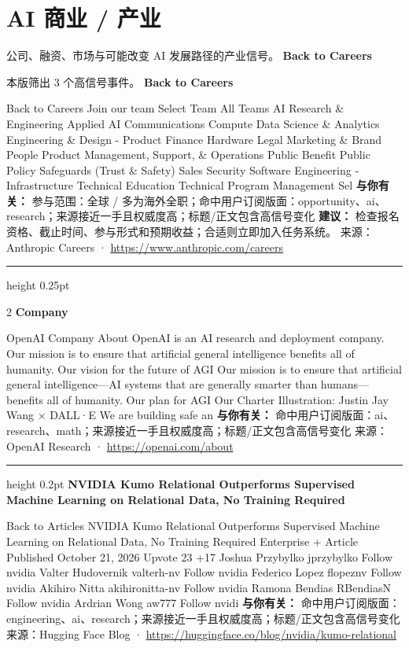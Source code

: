 \documentclass[10.5pt]{ctexart}
\begin{document}
\section*{AI 商业 / 产业}
{\color{ormuted} 公司、融资、市场与可能改变 AI 发展路径的产业信号。}
\vspace{2mm}
{\LARGE\bfseries Back to Careers}\par
\vspace{1mm}
{\color{ormuted} 本版筛出 3 个高信号事件。}
\vspace{3mm}
{\Large\bfseries Back to Careers}\par
Back to Careers Join our team Select Team All Teams AI Research \& Engineering Applied AI Communications Compute Data Science \& Analytics Engineering \& Design - Product Finance Hardware Legal Marketing \& Brand People Product Management, Support, \& Operations Public Benefit Public Policy Safeguards (Trust \& Safety) Sales Security Software Engineering - Infrastructure Technical Education Technical Program Management Sel
\textbf{与你有关：} 参与范围：全球 / 多为海外全职；命中用户订阅版面：opportunity、ai、research；来源接近一手且权威度高；标题/正文包含高信号变化
\textbf{建议：} 检查报名资格、截止时间、参与形式和预期收益；合适则立即加入任务系统。
{\footnotesize\color{ormuted} 来源：Anthropic Careers · \url{https://www.anthropic.com/careers}}
\vspace{4mm}
\hrule height 0.25pt
\vspace{3mm}
\begin{multicols}{2}
{\large\bfseries Company}\par
OpenAI Company About OpenAI is an AI research and deployment company. Our mission is to ensure that artificial general intelligence benefits all of humanity. Our vision for the future of AGI Our mission is to ensure that artificial general intelligence—AI systems that are generally smarter than humans—benefits all of humanity. Our plan for AGI Our Charter Illustration: Justin Jay Wang × DALL·E We are building safe an
\textbf{与你有关：} 命中用户订阅版面：ai、research、math；来源接近一手且权威度高；标题/正文包含高信号变化
{\footnotesize\color{ormuted} 来源：OpenAI Research · \url{https://openai.com/about}}
\vspace{2mm}
\hrule height 0.2pt
\vspace{2mm}
{\large\bfseries NVIDIA Kumo Relational Outperforms Supervised Machine Learning on Relational Data, No Training Required}\par
Back to Articles NVIDIA Kumo Relational Outperforms Supervised Machine Learning on Relational Data, No Training Required Enterprise + Article Published October 21, 2026 Upvote 23 +17 Joshua Przybylko jprzybylko Follow nvidia Valter Hudovernik valterh-nv Follow nvidia Federico Lopez flopeznv Follow nvidia Akihiro Nitta akihironitta-nv Follow nvidia Ramona Bendias RBendiasN Follow nvidia Ardrian Wong aw777 Follow nvidi
\textbf{与你有关：} 命中用户订阅版面：engineering、ai、research；来源接近一手且权威度高；标题/正文包含高信号变化
{\footnotesize\color{ormuted} 来源：Hugging Face Blog · \url{https://huggingface.co/blog/nvidia/kumo-relational}}
\end{multicols}
\end{document}
